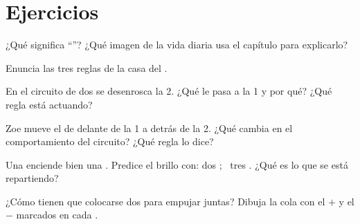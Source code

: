 \section{Ejercicios}

\begin{exercise}[$\star$]\label{exo:g4:series-circuits:1}
¿Qué significa ``''? ¿Qué imagen de la vida diaria usa el
capítulo para explicarlo?
\end{exercise}

\begin{exercise}[$\star$]\label{exo:g4:series-circuits:2}
Enuncia las tres reglas de la casa del .
\end{exercise}

\begin{exercise}[$\star$]\label{exo:g4:series-circuits:3}
En el circuito de dos  se desenrosca la  2. ¿Qué
le pasa a la  1 y por qué? ¿Qué regla está actuando?
\end{exercise}

\begin{exercise}[$\star$]\label{exo:g4:series-circuits:4}
Zoe mueve el  de delante de la  1 a detrás de
la  2. ¿Qué cambia en el comportamiento del circuito? ¿Qué
regla lo dice?
\end{exercise}

\begin{exercise}[$\star$]\label{exo:g4:series-circuits:5}
Una  enciende bien una . Predice el brillo con:
dos  ; \ tres  . ¿Qué es lo
que se está repartiendo?
\end{exercise}

\begin{exercise}[$\star$]\label{exo:g4:series-circuits:6}
¿Cómo tienen que colocarse dos  para empujar juntas? Dibuja la
cola con el $+$ y el $-$ marcados en cada .
\end{exercise}

